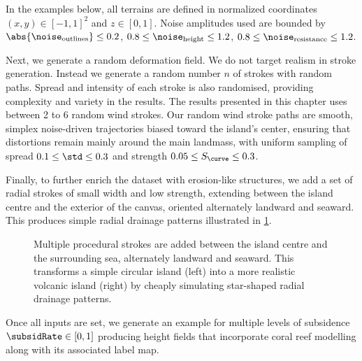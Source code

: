 In the examples below, all terrains are defined in normalized coordinates $(x, y) \in [-1, 1]^2$ and $z \in [0, 1]$. Noise amplitudes used are bounded by $\abs{\noise_{\text{outlines}}} \leq 0.2$, $0.8 \leq \noise_{\text{height}} \leq 1.2$, $0.8 \leq \noise_{\text{resistance}} \leq 1.2$.

Next, we generate a random deformation field. We do not target realism in stroke generation. Instead we generate a random number $n$ of strokes with random paths. Spread and intensity of each stroke is also randomised, providing complexity and variety in the results. The results presented in this chapter uses between 2 to 6 random wind strokes. Our random wind stroke paths are smooth, simplex noise-driven trajectories biased toward the island's center, ensuring that distortions remain mainly around the main landmass, with uniform sampling of spread $0.1 \leq \std \leq 0.3$ and strength $0.05 \leq S_\curve \leq 0.3$.

Finally, to further enrich the dataset with erosion-like structures, we add a set of radial strokes of small width and low strength, extending between the island centre and the exterior of the canvas, oriented alternately landward and seaward. This produces simple radial drainage patterns illustrated in \cref{fig:coral-island-radial-pattern-example}.

\begin{figure}
    \caption[Radial drainage inserted in our dataset generation]{Multiple procedural strokes are added between the island centre and the surrounding sea, alternately landward and seaward. This transforms a simple circular island (left) into a more realistic volcanic island (right) by cheaply simulating star-shaped radial drainage patterns.}
    \label{fig:coral-island-radial-pattern-example}
\end{figure}

Once all inputs are set, we generate an example for multiple levels of subsidence $\subsidRate \in [0, 1]$ producing height fields that incorporate coral reef modelling along with its associated label map.

